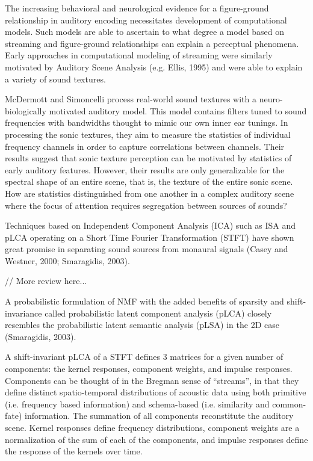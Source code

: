 The increasing behavioral and neurological evidence for a figure-ground relationship in auditory encoding necessitates development of computational models.  Such models are able to ascertain to what degree a model based on streaming and figure-ground relationships can explain a perceptual phenomena.  Early approaches in computational modeling of streaming were similarly motivated by Auditory Scene Analysis (e.g. Ellis, 1995) and were able to explain a variety of sound textures.  

McDermott and Simoncelli process real-world sound textures with a neuro-biologically motivated auditory model.  This model contains filters tuned to sound frequencies with bandwidths thought to mimic our own inner ear tunings.  In processing the sonic textures, they aim to measure the statistics of individual frequency channels in order to capture correlations between channels.  Their results suggest that sonic texture perception can be motivated by statistics of early auditory features.  However, their results are only generalizable for the spectral shape of an entire scene, that is, the texture of the entire sonic scene.  How are statistics distinguished from one another in a complex auditory scene where the focus of attention requires segregation between sources of sounds?  

Techniques based on Independent Component Analysis (ICA) such as ISA and pLCA operating on a Short Time Fourier Transformation (STFT) have shown great promise in separating sound sources from monaural signals (Casey and Westner, 2000; Smaragidis, 2003). 
	
	// More review here... 
		
A probabilistic formulation of NMF with the added benefits of sparsity and shift-invariance called probabilistic latent component analysis (pLCA) closely resembles the probabilistic latent semantic analysis (pLSA) in the 2D case (Smaragidis, 2003). 
	
A shift-invariant pLCA of a STFT defines 3 matrices for a given number of components: the kernel responses, component weights, and impulse responses.  Components can be thought of in the Bregman sense of ``streams'', in that they define distinct spatio-temporal distributions of acoustic data using both primitive (i.e. frequency based information) and schema-based (i.e. similarity and common-fate) information.  The summation of all components reconstitute the auditory scene.  Kernel responses define frequency distributions, component weights are a normalization of the sum of each of the components, and impulse responses define the response of the kernels over time.
	

